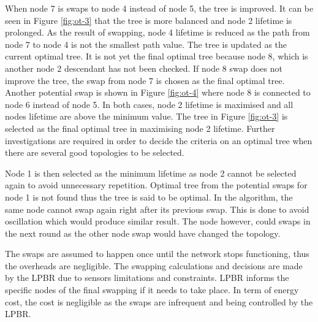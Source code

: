 When node 7 is swaps to node 4 instead of node 5, the tree is improved. It can be seen in Figure \ref{fig:ot-3} that the tree is more balanced and node 2 lifetime is prolonged. As the result of swapping, node 4 lifetime is reduced as the path from node 7 to node 4 is not the smallest path value. The tree is updated as the current optimal tree. It is not yet the final optimal tree because node 8, which is another node 2 descendant has not been checked. If node 8 swap does not improve the tree, the swap from node 7 is chosen as the final optimal tree. 
Another potential swap is shown in Figure \ref{fig:ot-4} where node 8 is connected to node 6 instead of node 5. In both cases, node 2 lifetime is maximised and all nodes lifetime are above the minimum value. The tree in Figure \ref{fig:ot-3} is selected as the final optimal tree in maximising node 2 lifetime. Further investigations are required in order to decide the criteria on an optimal tree when there are several good topologies to be selected. 

Node 1 is then selected as the minimum lifetime as node 2 cannot be selected again to avoid unnecessary repetition. Optimal tree from the potential swaps for node 1 is not found thus the tree is said to be optimal. In the algorithm, the same node cannot swap again right after its previous swap. This is done to avoid oscillation which would produce similar result. The node however, could swaps in the next round as the other node swap would have changed the topology.

The swaps are assumed to happen once until the network stops functioning, thus the overheads are negligible. The swapping calculations and decisions are made by the LPBR due to sensors limitations and constraints. LPBR informs the specific nodes of the final swapping if it needs to take place. In term of energy cost, the cost is negligible as the swaps are infrequent and being controlled by the LPBR.

